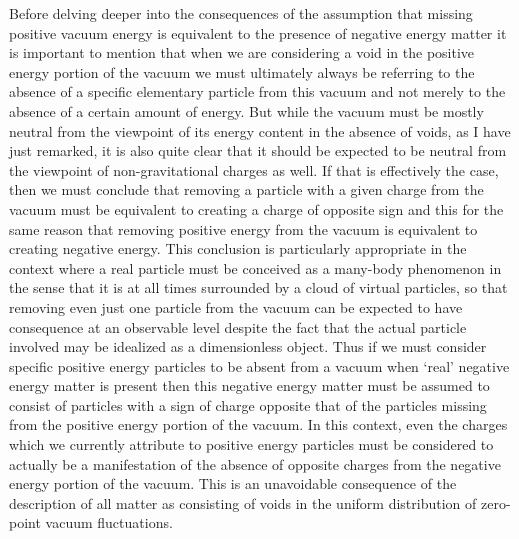 \documentclass[notitlepage,12pt]{report}
\begin{document}
\noindent Before delving deeper into the consequences of the assumption that missing positive vacuum energy is equivalent to the presence of negative energy matter it is important to mention that when we are considering a void in the positive energy portion of the vacuum we must ultimately always be referring to the absence of a specific elementary particle from this vacuum and not merely to the absence of a certain amount of energy. But while the vacuum must be mostly neutral from the viewpoint of its energy content in the absence of voids, as I have just remarked, it is also quite clear that it should be expected to be neutral from the viewpoint of non-gravitational charges as well. If that is effectively the case, then we must conclude that removing a particle with a given charge from the vacuum must be equivalent to creating a charge of opposite sign and this for the same reason that removing positive energy from the vacuum is equivalent to creating negative energy. This conclusion is particularly appropriate in the context where a real particle must be conceived as a many-body phenomenon in the sense that it is at all times surrounded by a cloud of virtual particles, so that removing even just one particle from the vacuum can be expected to have consequence at an observable level despite the fact that the actual particle involved may be idealized as a dimensionless object. Thus if we must consider specific positive energy particles to be absent from a vacuum when `real' negative energy matter is present then this negative energy matter must be assumed to consist of particles with a sign of charge opposite that of the particles missing from the positive energy portion of the vacuum. In this context, even the charges which we currently attribute to positive energy particles must be considered to actually be a manifestation of the absence of opposite charges from the negative energy portion of the vacuum. This is an unavoidable consequence of the description of all matter as consisting of voids in the uniform distribution of zero-point vacuum fluctuations.

\bigskip
\end{document}
